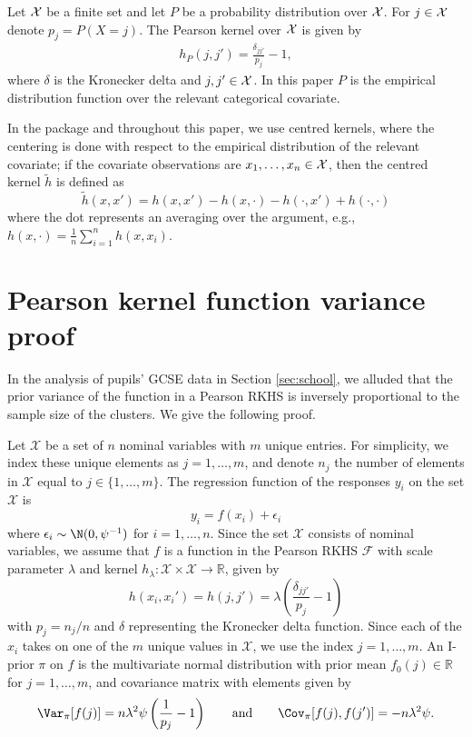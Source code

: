 \documentclass[english, 11pt]{article}
\begin{document}
Let $\cal X$ be a finite set and let $P$ be a probability distribution over $\cal X$. For $j\in\cal X$ denote $p_j=P(X=j)$.
The Pearson kernel over $\cal X$ is given by
\begin{eqnarray*}\label{kern2}
	h_{P}(j,j') = \frac{\delta_{jj'}}{p_j} - 1,
\end{eqnarray*}
where $\delta$ is the Kronecker delta and $j,j'\in\cal X$.
In this paper $P$ is the empirical distribution function over the relevant categorical covariate.


In the  package and throughout this paper, we use centred kernels, where the centering is done with respect to the empirical distribution of the relevant covariate; if the covariate observations are $x_1,\ldots,x_n\in\cal X$, then the centred kernel $\tilde h$ is defined as
\[  \tilde h(x,x') = h(x,x') - h(x,\cdot) - h(\cdot,x') + h(\cdot,\cdot) \]
where the dot represents an averaging over the argument, e.g., $h(x,\cdot)=\frac1n\sum_{i=1}^nh(x,x_i)$.



\section{Pearson kernel function variance proof}
\label{apx:pears}

In the analysis of pupils' GCSE data in Section \ref{sec:school}, we alluded that the prior variance of the function in a Pearson RKHS is inversely proportional to the sample size of the clusters. We give the following proof.

\begin{lem}
	Let $\mathcal X$ be a set of $n$ nominal variables with $m$ unique entries. For simplicity, we index these unique elements as $j = 1, \dots, m$, and denote $n_j$ the number of elements in $\mathcal X$ equal to $j \in \{ 1, \dots, m\}$. The regression function of the responses $y_i$ on the set $\mathcal X$ is 
	\[
		y_i = f(x_i) + \epsilon_i
	\]
	where $\epsilon_i \sim \N(0, \psi^{-1})$ for $i = 1,\dots,n$. Since the set $\mathcal X$ consists of nominal variables, we assume that $f$ is a function in the Pearson RKHS $\mathcal F$ with scale parameter $\lambda$ and kernel $h_\lambda:\mathcal X \times \mathcal X \rightarrow \mathbb R$, given by
	\[
		h(x_i, x_i') = h(j, j') = \lambda\left(\frac{\delta_{jj'}}{p_j} - 1 \right)
	\]
	with $p_j = n_j / n$ and $\delta$ representing the Kronecker delta function. Since each of the $x_i$ takes on one of the $m$ unique values in $\mathcal X$, we use the index $j = 1,\dots, m$. An I-prior $\pi$ on $f$ is the multivariate normal distribution with prior mean $f_0(j) \in \mathbb R$ for $j = 1,\dots,m$, and covariance matrix with elements given by
	\begin{align*}
		\Var_\pi[f(j)] = n \lambda^2 \psi  \left(\frac{1}{p_j} - 1 \right) 
		\hspace{2em} \text{and} \hspace{2em}
		\Cov_\pi[f(j), f(j')] = - n \lambda^2 \psi .
	\end{align*}
\end{lem}
\end{document}
